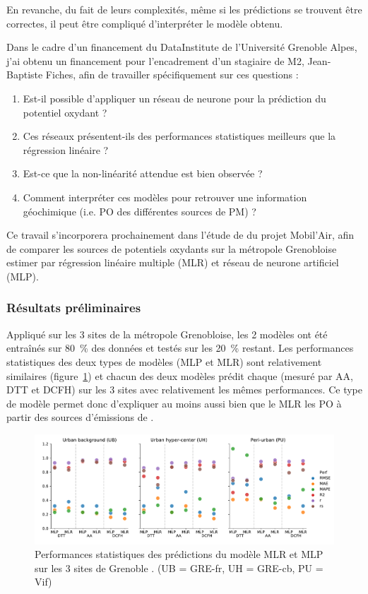 En revanche, du fait de leurs complexités, même si les prédictions se trouvent être
correctes, il peut être compliqué d'interpréter le modèle obtenu.


Dans le cadre d'un financement du DataInstitute de l'Université Grenoble Alpes, j'ai
obtenu un financement pour l'encadrement d'un stagiaire de M2, Jean-Baptiste Fiches, afin
de travailler spécifiquement sur ces questions :
\begin{enumerate}
    \item Est-il possible d'appliquer un réseau de neurone pour la prédiction du potentiel
        oxydant ?
    \item Ces réseaux présentent-ils des performances statistiques meilleurs que la
        régression linéaire ?
    \item Est-ce que la non-linéarité attendue est bien observée ?
    \item Comment interpréter ces modèles pour retrouver une information géochimique (i.e.
        PO des différentes sources de PM) ?
\end{enumerate}
Ce travail s'incorporera prochainement dans l'étude de \cite{borlazaUrbaninprep.} du
projet Mobil'Air, afin de comparer les sources de potentiels oxydants sur la
métropole Grenobloise estimer par régression linéaire multiple (MLR) et réseau de neurone
artificiel (MLP).


\subsubsection{Résultats préliminaires}%
\label{ssub:résultats_préliminaires}

Appliqué sur les 3 sites de la métropole Grenobloise, les 2 modèles ont été entraînés sur
\SI{80}{\percent} des données et testés sur les \SI{20}{\percent} restant. Les performances
statistiques des deux types de modèles (MLP et MLR) sont relativement
similaires (figure~\ref{fig:perfMLPMLR}) et chacun des deux modèles prédit chaque \POv{}
(mesuré par AA, DTT et DCFH) sur les 3 sites avec relativement les mêmes performances.
Ce type de modèle permet donc d'expliquer au moins aussi bien que le MLR les PO à partir
des sources d'émissions de \PMdix.

\begin{figure}[ht]
    \centering
    \includegraphics[width=1.0\linewidth]{figures/chapter05/perfMLPMLR.pdf}
    \caption{Performances statistiques des prédictions du modèle MLR et MLP sur les 3
    sites de Grenoble \autocite{borlazaUrbaninprep.}. (UB = GRE-fr, UH = GRE-cb, PU = Vif)}%
    \label{fig:perfMLPMLR}
\end{figure}

